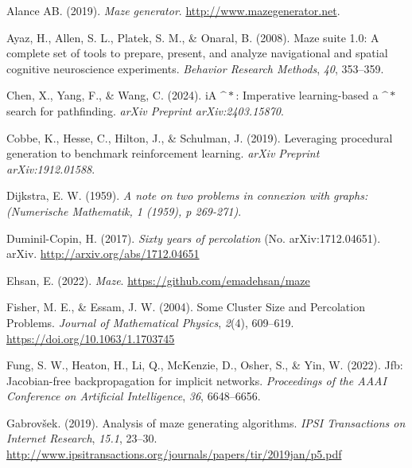 \documentclass[10pt,a4paper,onecolumn]{article}
\newlength{\cslhangindent}
\newenvironment{CSLReferences}[2] %
 {\begin{list}{}{%
  \setlength{\itemindent}{0pt}
  \setlength{\leftmargin}{0pt}
  \setlength{\parsep}{0pt}
  \ifodd #1
   \setlength{\leftmargin}{\cslhangindent}
   \setlength{\itemindent}{-1\cslhangindent}
  \fi
  \setlength{\itemsep}{#2\baselineskip}}}
 {\end{list}}
\begin{document}
\hypertarget{refs}{}
\begin{CSLReferences}{1}{0.5}
\leavevmode{}%
Alance AB. (2019). \emph{Maze generator}.
\url{http://www.mazegenerator.net}.

\leavevmode{}%
Ayaz, H., Allen, S. L., Platek, S. M., \& Onaral, B. (2008). Maze suite
1.0: A complete set of tools to prepare, present, and analyze
navigational and spatial cognitive neuroscience experiments.
\emph{Behavior Research Methods}, \emph{40}, 353--359.

\leavevmode{}%
Chen, X., Yang, F., \& Wang, C. (2024). iA \(\^{}*\): Imperative
learning-based a \(\^{}*\) search for pathfinding. \emph{arXiv Preprint
arXiv:2403.15870}.

\leavevmode{}%
Cobbe, K., Hesse, C., Hilton, J., \& Schulman, J. (2019). Leveraging
procedural generation to benchmark reinforcement learning. \emph{arXiv
Preprint arXiv:1912.01588}.

\leavevmode{}%
Dijkstra, E. W. (1959). \emph{A note on two problems in connexion with
graphs:({Numerische Mathematik}, 1 (1959), p 269-271)}.

\leavevmode{}%
Duminil-Copin, H. (2017). \emph{Sixty years of percolation} (No.
arXiv:1712.04651). {arXiv}. \url{http://arxiv.org/abs/1712.04651}

\leavevmode{}%
Ehsan, E. (2022). \emph{Maze}. \url{https://github.com/emadehsan/maze}

\leavevmode{}%
Fisher, M. E., \& Essam, J. W. (2004). Some {Cluster Size} and
{Percolation Problems}. \emph{Journal of Mathematical Physics},
\emph{2}(4), 609--619. \url{https://doi.org/10.1063/1.1703745}

\leavevmode{}%
Fung, S. W., Heaton, H., Li, Q., McKenzie, D., Osher, S., \& Yin, W.
(2022). Jfb: Jacobian-free backpropagation for implicit networks.
\emph{Proceedings of the AAAI Conference on Artificial Intelligence},
\emph{36}, 6648--6656.

\leavevmode{}%
Gabrovšek. (2019). Analysis of maze generating algorithms. \emph{{IPSI
Transactions} on {Internet Research}}, \emph{15.1}, 23--30.
\url{http://www.ipsitransactions.org/journals/papers/tir/2019jan/p5.pdf}


\end{CSLReferences}
\end{document}
